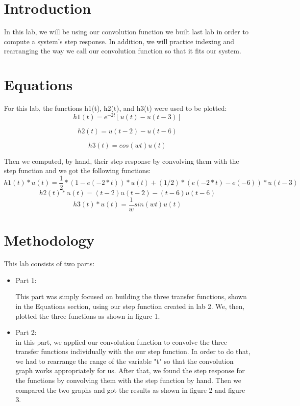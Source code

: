 \documentclass[12pt]{report}
\begin{document}
\section{Introduction}
In this lab, we will be using our convolution function we built last lab in order to compute a system's step response. In addition, we will practice indexing and rearranging the way we call our convolution function so that it fits our system.

\section{Equations}

For this lab, the functions h1(t), h2(t), and h3(t) were used to be plotted:
\begin{equation}
    h1(t) =  e^{−2t}[u(t) − u(t − 3)]
\end{equation}

\begin{equation}
    h2(t) = u(t − 2) − u(t − 6)
\end{equation}

\begin{equation}
    h3(t) = cos(wt)u(t)
\end{equation}

Then we computed, by hand, their step response by convolving them with the step function and we got the following functions:
\begin{equation}
    h1(t)*u(t) = \frac{1}{2}*(1 - e(-2*t))*u(t) + (1/2)*(e(-2*t) - e(-6))*u(t-3)
\end{equation}
\begin{equation}
    h2(t)*u(t) = (t-2)u(t-2) - (t-6)u(t-6)
\end{equation}
\begin{equation}
    h3(t)*u(t) = \frac{1}{w}sin(wt)u(t)
\end{equation}

\section{Methodology}

This lab consists of two parts:
\begin{itemize}
    \item
    Part 1:
    
    This part was simply focused on building the three transfer functions, shown in the Equations section, using our step function created in lab 2. We, then, plotted the three functions as shown in figure 1.

    \item
    Part 2:\\
    in this part, we applied our convolution function to convolve the three transfer functions individually with the our step function. In order to do that, we had to rearrange the range of the variable "t" so that the convolution graph works appropriately for us. After that, we found the step response for the functions by convolving them with the step function by hand. Then we compared the two graphs and got the results as shown in figure 2 and figure 3.
\end{itemize}
   
\end{document}
